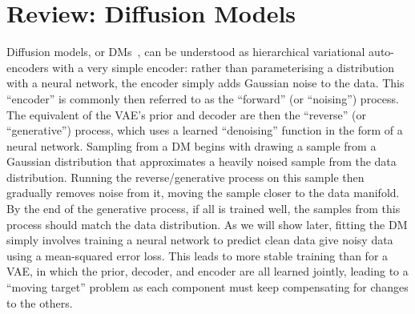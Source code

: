 \chapter{Review: Diffusion Models}
\label{sec:diffusion}

Diffusion models, or DMs~\citep{sohl2015deep,ho2020denoising,nichol2021improved,song2020score}, can be understood as hierarchical variational auto-encoders with a very simple encoder: rather than parameterising a distribution with a neural network, the encoder simply adds Gaussian noise to the data. This ``encoder'' is commonly then referred to as the ``forward'' (or ``noising'') process. The equivalent of the VAE's prior and decoder are then the ``reverse'' (or ``generative'') process, which uses a learned ``denoising'' function in the form of a neural network. Sampling from a DM begins with drawing a sample from a Gaussian distribution that approximates a heavily noised sample from the data distribution. Running the reverse/generative process on this sample then gradually removes noise from it, moving the sample closer to the data manifold. By the end of the generative process, if all is trained well, the samples from this process should match the data distribution. As we will show later, fitting the DM simply involves training a neural network to predict clean data give noisy data using a mean-squared error loss. This leads to more stable training than for a VAE, in which the prior, decoder, and encoder are all learned jointly, leading to a ``moving target'' problem as each component must keep compensating for changes to the others.

